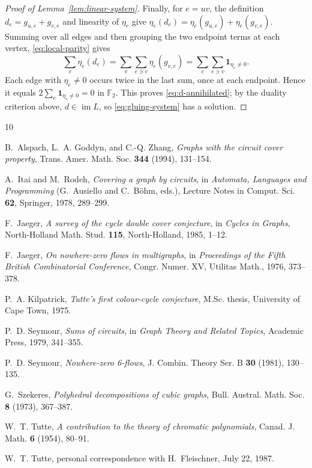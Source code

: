 \documentclass{amsart}
\newcommand{\F}{\mathbb{F}}
\newcommand{\ind}{\mathbf{1}}
\newcommand{\im}{\operatorname{im}}
\begin{document}
\begin{proof}[Proof of Lemma~\ref{lem:linear-system}]
Finally, for $e=uv$, the definition $d_e=g_{u,e}+g_{v,e}$ and linearity of
$\eta_e$ give
$\eta_e(d_e)=\eta_e(g_{u,e})+\eta_e(g_{v,e})$. Summing over all edges and then
grouping the two endpoint terms at each vertex, \eqref{eq:local-parity} gives
\[
  \sum_e\eta_e(d_e)
  =\sum_v\sum_{e\ni v}\eta_e(g_{v,e})
  =\sum_v\sum_{e\ni v}\ind_{\eta_e\ne 0}.
\]
Each edge with $\eta_e\ne 0$ occurs twice in the last sum, once at each
endpoint. Hence it equals $2\sum_e\ind_{\eta_e\ne 0}=0$ in $\F_2$. This proves
\eqref{eq:d-annihilated}; by the duality criterion above, $d\in\im L$, so
\eqref{eq:gluing-system} has a solution.
\end{proof}

\begin{thebibliography}{10}

B.~Alspach, L.~A. Goddyn, and C.-Q. Zhang,
\emph{Graphs with the circuit cover property},
Trans. Amer. Math. Soc. \textbf{344} (1994), 131--154.

A.~Itai and M.~Rodeh,
\emph{Covering a graph by circuits},
in \emph{Automata, Languages and Programming} (G.~Ausiello and C.~B\"ohm, eds.),
Lecture Notes in Comput. Sci. \textbf{62}, Springer, 1978, 289--299.

F.~Jaeger,
\emph{A survey of the cycle double cover conjecture},
in \emph{Cycles in Graphs}, North-Holland Math. Stud. \textbf{115},
North-Holland, 1985, 1--12.

F.~Jaeger,
\emph{On nowhere-zero flows in multigraphs},
in \emph{Proceedings of the Fifth British Combinatorial Conference},
Congr. Numer. XV, Utilitas Math., 1976, 373--378.

P.~A. Kilpatrick,
\emph{Tutte's first colour-cycle conjecture},
M.Sc. thesis, University of Cape Town, 1975.

P.~D. Seymour,
\emph{Sums of circuits},
in \emph{Graph Theory and Related Topics}, Academic Press, 1979, 341--355.

P.~D. Seymour,
\emph{Nowhere-zero 6-flows},
J. Combin. Theory Ser. B \textbf{30} (1981), 130--135.

G.~Szekeres,
\emph{Polyhedral decompositions of cubic graphs},
Bull. Austral. Math. Soc. \textbf{8} (1973), 367--387.

W.~T. Tutte,
\emph{A contribution to the theory of chromatic polynomials},
Canad. J. Math. \textbf{6} (1954), 80--91.

W.~T. Tutte,
personal correspondence with H.~Fleischner, July 22, 1987.

\end{thebibliography}
\end{document}
